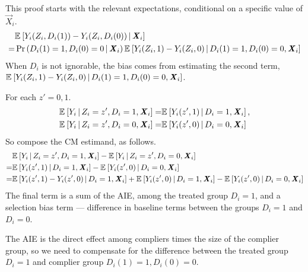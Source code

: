 This proof starts with the relevant expectations, conditional on a specific value of $\vec X_i$.
\begin{align*}
    &\Egiven{ Y_i(Z_i, D_i(1)) - Y_i(Z_i, D_i(0))}{\vec X_i} \\
    =& \Probgiven{D_i(1) = 1, D_i(0) = 0}{\vec X_i}
        \Egiven{ Y_i(Z_i, 1) - Y_i(Z_i, 0)}{D_i(1) = 1, D_i(0) = 0, \vec X_i}
\end{align*}
When $D_i$ is not ignorable, the bias comes from estimating the second term,\\ $\Egiven{ Y_i(Z_i, 1) - Y_i(Z_i, 0)}{D_i(1) = 1, D_i(0) = 0, \vec X_i}$.

For each $z' =0, 1$.
\begin{align*}
    \Egiven{Y_i}{Z_i = z', D_i = 1, \vec X_i}
    =& \Egiven{Y_i(z', 1)}{D_i = 1, \vec X_i}, \\
    \Egiven{Y_i}{Z_i = z', D_i = 0, \vec X_i}
    =& \Egiven{Y_i(z', 0)}{D_i = 0, \vec X_i}
\end{align*}
So compose the CM estimand, as follows.
\begin{align*}
    & \Egiven{Y_i}{Z_i = z', D_i = 1, \vec X_i}
    - \Egiven{Y_i}{Z_i = z', D_i = 0, \vec X_i} \\
    =& \Egiven{Y_i(z', 1)}{D_i = 1, \vec X_i}
        - \Egiven{Y_i(z', 0)}{D_i = 0, \vec X_i} \\
    =& \Egiven{Y_i(z', 1) - Y_i(z', 0)}{D_i = 1, \vec X_i}
    + \Egiven{Y_i(z', 0)}{D_i = 1, \vec X_i} - \Egiven{Y_i(z', 0)}{D_i = 0, \vec X_i}
\end{align*}
The final term is a sum of the AIE, among the treated group $D_i = 1$, and a selection bias term --- difference in baseline terms between the groups $D_i = 1$ and $D_i = 0$.

The AIE is the direct effect among compliers times the size of the complier group, so we need to compensate for the difference between the treated group $D_i = 1$ and complier group $D_i(1)= 1, D_i(0) = 0$.

